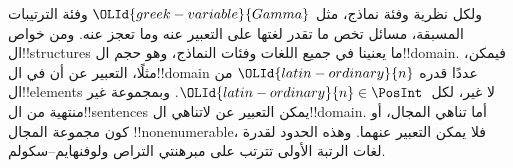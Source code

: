 \documentclass[../../../include/open-logic-section]{subfiles}
\begin{document}
ولكل نظرية وفئة نماذج، مثل ${\OLId{greek-variable}{Gamma}}$ وفئة الترتيبات المسبقة،
مسائل تخص ما تقدر لغتها على التعبير عنه وما تعجز عنه.
ومن خواص ال!!{structure}s ما يعنينا في جميع اللغات وفئات
النماذج، وهو حجم ال!!{domain}. فيمكن، مثلًا، التعبير عن
أن في ال!!{domain} عددًا قدره ${\OLId{latin-ordinary}{n}}$ من ال!!{element}s
لا غير، لكل~${\OLId{latin-ordinary}{n}} \in \PosInt$. وبمجموعة غير منتهية من
ال!!{sentence}s يمكن التعبير عن لاتناهي ال!!{domain}.
أما تناهي المجال، أو كون مجموعة المجال !!{nonenumerable}،
فلا يمكن التعبير عنهما. وهذه الحدود لقدرة لغات الرتبة الأولى
تترتب على مبرهنتي التراص ولوفنهايم--سكولم.
\end{document}
